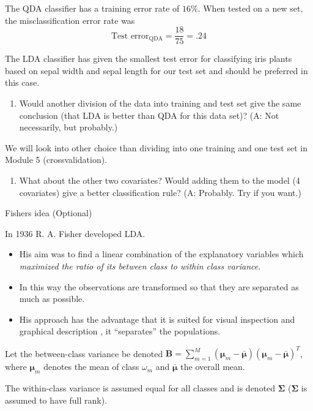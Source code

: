 \documentclass[10pt,ignorenonframetext,]{beamer}
\providecommand{\tightlist}{%
  \setlength{\itemsep}{0pt}\setlength{\parskip}{0pt}}
\begin{document}
\begin{frame}

The QDA classifier has a training error rate of \(16\%\). When tested on
a new set, the misclassification error rate was
\[\text{Test error}_\text{QDA}  = \frac{18}{75}=.24\]

The LDA classifier has given the smallest test error for classifying
iris plants based on sepal width and sepal length for our test set and
should be preferred in this case.

\begin{enumerate}
\def\labelenumi{\arabic{enumi}.}
\tightlist
\item
  Would another division of the data into training and test set give the
  same conclusion (that LDA is better than QDA for this data set)? (A:
  Not necessarily, but probably.)
\end{enumerate}

We will look into other choice than dividing into one training and one
test set in Module 5 (crossvalidation).

\begin{enumerate}
\def\labelenumi{\arabic{enumi}.}
\setcounter{enumi}{1}
\tightlist
\item
  What about the other two covariates? Would adding them to the model (4
  covariates) give a better classification rule? (A: Probably. Try if
  you want.)
\end{enumerate}

\end{frame}

\begin{frame}

\begin{block}{Fishers idea (Optional)}

In 1936 R. A. Fisher developed LDA.

\begin{itemize}
\tightlist
\item
  His aim was to find a linear combination of the explanatory variables
  which \emph{maximized the ratio of its between class to within class
  variance}.
\item
  In this way the observations are transformed so that they are
  separated as much as possible.
\item
  His approach has the advantage that it is suited for visual inspection
  and graphical description , it ``separates'' the populations.
\end{itemize}

Let the between-class variance be denoted
\(\boldsymbol{B}=\sum_{m=1}^{M}(\boldsymbol{\mu}_{m}- \bar{\boldsymbol{\mu}})(\boldsymbol{\mu}_{m}-\bar{\boldsymbol{\mu}})^{T}\),
where \(\boldsymbol{\mu}_{m}\) denotes the mean of class \(\omega_{m}\)
and \(\bar{\boldsymbol{\mu}}\) the overall mean.

The within-class variance is assumed equal for all classes and is
denoted \(\boldsymbol{\Sigma}\) (\(\boldsymbol{\Sigma}\) is assumed to
have full rank).

\end{block}

\end{frame}
\end{document}
